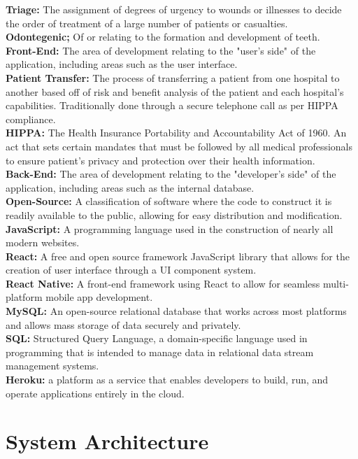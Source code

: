 \documentclass[11pt,letterpaper]{article}
\begin{document}
\textbf{Triage:} The assignment of degrees of urgency to wounds or illnesses to decide the order of treatment of a large number of patients or casualties.
\\
\textbf{Odontegenic;} Of or relating to the formation and development of teeth.
\\
\textbf{Front-End:} The area of development relating to the "user's side" of the application, including areas such as the user interface.
\\
\textbf{Patient Transfer:} The process of transferring a patient from one hospital to another based off of risk and benefit analysis of the patient and each hospital's capabilities. Traditionally done through a secure telephone call as per HIPPA compliance.
\\
\textbf{HIPPA:} The Health Insurance Portability and Accountability Act of 1960. An act that sets certain mandates that must be followed by all medical professionals to ensure patient's privacy and protection over their health information.
\\
\textbf{Back-End:} The area of development relating to the "developer's side" of the application, including areas such as the internal database.
\\
\textbf{Open-Source:} A classification of software where the code to construct it is readily available to the public, allowing for easy distribution and modification.
\\
\textbf{JavaScript:} A programming language used in the construction of nearly all modern websites.
\\
\textbf{React:}  A free and open source framework JavaScript library that allows for the creation of user interface through a UI component system.
\\
\textbf{React Native:} A front-end framework using React to allow for seamless multi-platform mobile app development. 
\\
\textbf{MySQL:} An open-source relational database that works across most platforms and allows mass storage of data securely and privately.
\\
\textbf{SQL:} Structured Query Language, a domain-specific language used in programming that is
intended to manage data in relational data stream management systems.
\\
\textbf{Heroku:} a platform as a service that enables developers to build, run, and operate applications entirely in the cloud.


\section{System Architecture}
\end{document}
